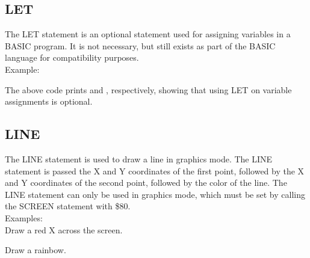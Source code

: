 \subsection{LET}

The {\ttfamily LET} statement is an optional statement used for assigning
variables in a BASIC program.  It is not necessary, but still exists as part of
the BASIC language for compatibility purposes.\\

Example:\\


The above code prints {} and {}, respectively, showing
that using {\ttfamily LET} on variable assignments is optional.

\subsection{LINE}

The {\ttfamily LINE} statement is used to draw a line in graphics mode.  The
{\ttfamily LINE} statement is passed the X and Y coordinates of the first
point, followed by the X and Y coordinates of the second point, followed by the
color of the line.  The {\ttfamily LINE} statement can only be used in graphics
mode, which must be set by calling the {\ttfamily SCREEN} statement with
{\ttfamily \$80}.\\

Examples:\\

Draw a red X across the screen.\\


Draw a rainbow.\\


